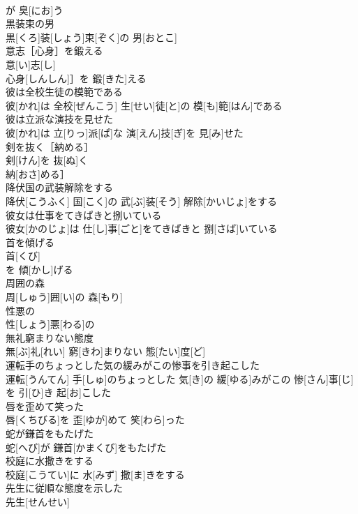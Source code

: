 \documentclass[8pt]{extreport}
\begin{document}
\begin{CJK}{UTF8}{min}
\\	が 臭[にお]う 
\\	黒装束の男	
\\	黒[くろ]装[しょう]束[ぞく]の 男[おとこ]
\\	意志［心身］を鍛える	
\\	意[い]志[し]
\\	心身[しんしん]］を 鍛[きた]える
\\	彼は全校生徒の模範である	
\\	彼[かれ]は 全校[ぜんこう] 生[せい]徒[と]の 模[も]範[はん]である
\\	彼は立派な演技を見せた	
\\	彼[かれ]は 立[りっ]派[ぱ]な 演[えん]技[ぎ]を 見[み]せた
\\	剣を抜く［納める］	
\\	剣[けん]を 抜[ぬ]く
\\	納[おさ]める］
\\	降伏国の武装解除をする	
\\	降伏[こうふく] 国[こく]の 武[ぶ]装[そう] 解除[かいじょ]をする
\\	彼女は仕事をてきぱきと捌いている	
\\	彼女[かのじょ]は 仕[し]事[ごと]をてきぱきと 捌[さば]いている
\\	首を傾げる	
\\	首[くび]
\\	を 傾[かし]げる 
\\	周囲の森	
\\	周[しゅう]囲[い]の 森[もり]
\\	性悪の	
\\	性[しょう]悪[わる]の
\\	無礼窮まりない態度	
\\	無[ぶ]礼[れい] 窮[きわ]まりない 態[たい]度[ど]
\\	運転手のちょっとした気の緩みがこの惨事を引き起こした	
\\	運転[うんてん] 手[しゅ]のちょっとした 気[き]の 緩[ゆる]みがこの 惨[さん]事[じ]を 引[ひ]き 起[お]こした
\\	唇を歪めて笑った	
\\	唇[くちびる]を 歪[ゆが]めて 笑[わら]った
\\	蛇が鎌首をもたげた	
\\	蛇[へび]が 鎌首[かまくび]をもたげた
\\	校庭に水撒きをする	
\\	校庭[こうてい]に 水[みず] 撒[ま]きをする
\\	先生に従順な態度を示した	
\\	先生[せんせい]

\end{CJK}
\end{document}
